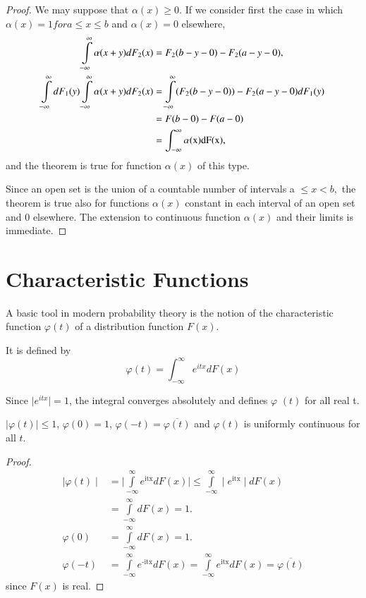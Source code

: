 \begin{proof}
  We may suppose that $\alpha (x) \geq 0$. If we consider first the case
  in which $\alpha (x) =1 for a \leq x \leq b$ and $\alpha (x) =0$
  elsewhere, 
{\fontsize{10pt}{12pt}\selectfont
  \begin{align*}
    \int\limits_{- \infty}^{\infty} \alpha (x+y) d F_2(x) & = F_2 (b - y -
    0) - F_2 (a - y - 0),\\ 
    \int\limits_{- \infty}^{\infty} dF_1 (y) \int\limits_{-
      \infty}^{\infty} \alpha (x+y) dF_2 (x) &=
    \int\limits_{-\infty}^{\infty} (F_2 (b-y-0)) -F_2(a-y-0)d F_1(y)\\  
    &= F(b-0)- F(a-0)\\
    &  = \rm{\int^\infty_{-\infty} \alpha(x) d F (x)},
  \end{align*}}\relax\pageoriginale
  and the theorem is true for function $\alpha  (x)$ of this type.
  
  Since an open set is the union of a countable number of intervals a $
  \leq x < b,$ the theorem is true also for functions $\alpha 
  (x)$ constant in each interval of an open set and 0 elsewhere. The
  extension to continuous function $\alpha (x)$ and their limits is immediate.
\end{proof}

\section{Characteristic Functions}\label{chap2:sec5}

A basic tool in modern probability theory is the notion of the
characteristic function $ \varphi (t)$ of a distribution function
$F(x)$.  

It is defined by 
$$ 
\varphi(t) = \int^\infty_{-\infty} e^{itx} dF(x)
$$

Since $\mid e^{itx}\mid =1$, the integral converges absolutely and
defines $ \varphi$ $(t)$ for all real t. 
 
\begin{theorem}\label{chap2:sec5:thm10} %
$\mid \varphi(t)\mid \leq 1$, $\varphi (0) =1$, $\varphi(-t) =
  \overline{\varphi (t)}$ and $\varphi (t)$ is uniformly continuous
  for all $t$. 
\end{theorem}

\begin{proof}
  \begin{align*}
    \mid \varphi(t)\mid &=\mid \int\limits^\infty_{-\infty} e^{\text{itx}} dF(x)\mid
    \leq  \int\limits^\infty_{-\infty} \mid e^{\text{itx}}\mid dF(x)\\  
    & = \int\limits^\infty_{-\infty} dF(x)=1.\\
    \varphi(0) & = \int\limits^\infty_{-\infty} dF(x)=1.\\
    \varphi(-t) & = \int\limits^\infty_{-\infty} e^{\text{-itx}} dF(x) =
    \int\limits^\infty_{-\infty} e^{\text{itx}} dF(x) = \overline{\varphi(t)} 
  \end{align*}\pageoriginale
  since $F(x)$ is real. 
\end{proof}

